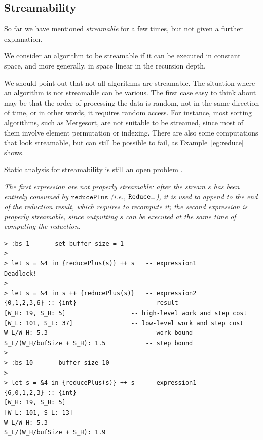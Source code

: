 \subsection{Streamability}

So far we have mentioned \emph{streamable} for a few times, but not given a further explanation.

We consider an algorithm to be streamable if it can be executed in constant space, and more generally, in space linear in the recursion depth.

We should point out that not all algorithms are streamable. 
The situation where an algorithm is not streamable can be various.
The first case easy to think about may be that the order of processing the data is random, not in the same direction of time, or in other words, it requires random access.
For instance, most sorting algorithms, such as Mergesort, are not suitable to be streamed, since most of them involve element permutation or indexing. There are also some computations that look streamable, but can still be possible to fail, as Example~\ref{eg:reduce} shows.

Static analysis for streamability is still an open problem \cite{Fphd}.

\begin{example}\label{eg:reduce}
	\emph{The first expression are not properly streamable: after the stream $s$ has been entirely consumed by $\mathtt{reducePlus}$ (i.e., $\mathtt{Reduce}_{+}$), it is used to append to the end of the reduction result, which requires to recompute it; the second expression is properly streamable, since outputting $s$ can be executed at the same time of computing the reduction.}
\end{example}
\begin{lstlisting}[style=nesl-style]
> :bs 1    -- set buffer size = 1
>
> let s = &4 in {reducePlus(s)} ++ s   -- expression1
Deadlock!
>
> let s = &4 in s ++ {reducePlus(s)}   -- expression2
{0,1,2,3,6} :: {int}                   -- result
[W_H: 19, S_H: 5]                  -- high-level work and step cost
[W_L: 101, S_L: 37]                -- low-level work and step cost
W_L/W_H: 5.3                           -- work bound
S_L/(W_H/bufSize + S_H): 1.5           -- step bound
>
> :bs 10    -- buffer size 10
>
> let s = &4 in {reducePlus(s)} ++ s   -- expression1 
{6,0,1,2,3} :: {int}
[W_H: 19, S_H: 5]
[W_L: 101, S_L: 13]
W_L/W_H: 5.3
S_L/(W_H/bufSize + S_H): 1.9
\end{lstlisting}


